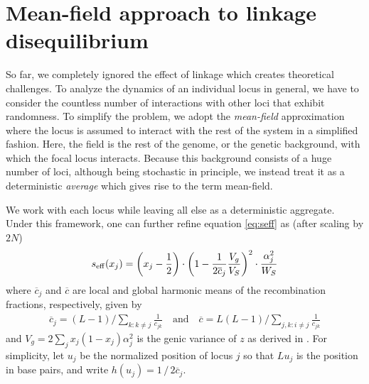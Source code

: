 \documentclass[10pt]{article}
\begin{document}
\section{Mean-field approach to linkage disequilibrium}
\label{sec:meanfield_ld}

So far, we completely ignored the effect of linkage which creates theoretical challenges.
To analyze the dynamics of an individual locus in general,
we have to consider the countless number of interactions with other loci that exhibit randomness.
To simplify the problem, we adopt the \emph{mean-field} approximation where the locus is assumed to interact with the rest of the system in a simplified fashion.
Here, the field is the rest of the genome, or the genetic background, with which the focal locus interacts.
Because this background consists of a huge number of loci,
although being stochastic in principle, we instead treat it as a deterministic \emph{average} which gives rise to the term mean-field.

We work with each locus while leaving all else as a deterministic aggregate.
Under this framework, one can further refine equation \eqref{eq:seff} as (after scaling by $2N$)
\begin{align} \label{eq:seff_ld}
    s_{\mathrm{eff}}(x_j) = \left(x_j-\frac{1}{2}\right)\cdot \left( 
    1- \frac{1}{2\overline{c}_j}\frac{V_g}{V_S}
    \right)^2 \cdot \frac{\alpha_j^2}{W_S} 
\end{align}
where $\overline{c}_j$ and $\overline{c}$ are local and global harmonic means of the recombination fractions, respectively, given by
\begin{gather}
    \overline{c}_j = (L-1) \bigg/ \sum_{k:k \neq j} \frac{1}{c_{jk}}
    \quad \text{and} \quad
    \overline{c} = L(L-1) \bigg/ \sum_{j,k:i \neq j} \frac{1}{c_{jk}}
\end{gather}
and $V_g = 2\sum_j x_j(1-x_j)\alpha_j^2$ is the genic variance of $z$ as derived in \citet{Negm_2026}.
For simplicity, let $u_j$ be the normalized position of locus $j$ so that $Lu_j$ is the position in base pairs, and write $h(u_j) = 1\, / \, 2\overline{c}_j$.
\end{document}
